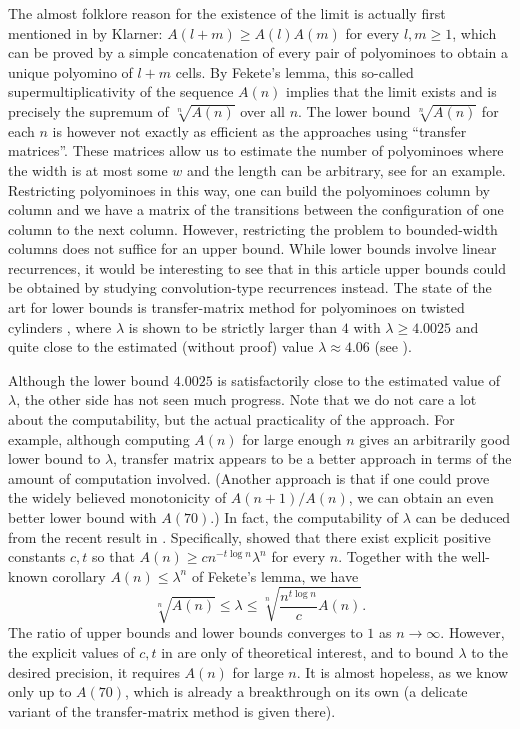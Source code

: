 \documentclass[a4paper,12pt]{article}
\begin{document}
The almost folklore reason for the existence of the limit is actually first mentioned in \cite{klarner1967cell} by Klarner: $A(l+m)\ge A(l)A(m)$ for every $l,m\ge 1$, which can be proved by a simple concatenation of every pair of polyominoes to obtain a unique polyomino of $l+m$ cells. By Fekete's lemma, this so-called supermultiplicativity of the sequence $A(n)$ implies that the limit exists and is precisely the supremum of $\sqrt[n]{A(n)}$ over all $n$.
The lower bound $\sqrt[n]{A(n)}$ for each $n$ is however not exactly as efficient as the approaches using ``transfer matrices''.
These matrices allow us to estimate the number of polyominoes where the width is at most some $w$ and the length can be arbitrary, see \cite{jensen2001enumerations} for an example. Restricting polyominoes in this way, one can build the polyominoes column by column and we have a matrix of the transitions between the configuration of one column to the next column. However, restricting the problem to bounded-width columns does not suffice for an upper bound. While lower bounds involve linear recurrences, it would be interesting to see that in this article upper bounds could be obtained by studying convolution-type recurrences instead. The state of the art for lower bounds is transfer-matrix method for polyominoes on twisted cylinders \cite{barequet2016lambda}, where $\lambda$ is shown to be strictly larger than $4$ with $\lambda\ge 4.0025$ and quite close to the estimated (without proof) value $\lambda\approx 4.06$ (see \cite{jensen2003counting}).  


Although the lower bound $4.0025$ is satisfactorily close to the estimated value of $\lambda$, the other side has not seen much progress. Note that we do not care a lot about the computability, but the actual practicality of the approach. For example, although computing $A(n)$ for large enough $n$ gives an arbitrarily good lower bound to $\lambda$, transfer matrix appears to be a better approach in terms of the amount of computation involved. (Another approach is that if one could prove the widely believed monotonicity of $A(n+1)/A(n)$, we can obtain an even better lower bound with $A(70)$.)
In fact, the computability of $\lambda$ can be deduced from the recent result in \cite{bui2024asymptotic}.
Specifically, \cite{bui2024asymptotic} showed that there exist explicit positive constants $c,t$ so that $A(n)\ge cn^{-t\log n} \lambda^n$ for every $n$. Together with the well-known corollary $A(n)\le\lambda^n$ of Fekete's lemma, we have
\[
    \sqrt[n]{A(n)} \le \lambda \le \sqrt[n]{\frac{n^{t\log n}}{c}A(n)}.
\]
The ratio of upper bounds and lower bounds converges to $1$ as $n\to\infty$.
However, the explicit values of $c,t$ in \cite{bui2024asymptotic} are only of theoretical interest, and to bound $\lambda$ to the desired precision, it requires $A(n)$ for large $n$. It is almost hopeless, as we know only up to $A(70)$, which is already a breakthrough on its own \cite{barequet2024counting} (a delicate variant of the transfer-matrix method is given there).
\end{document}
